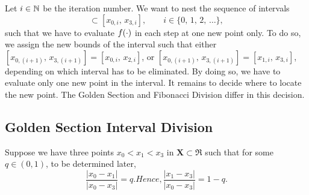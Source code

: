 Let $i \in {\mathbb N}$ be the iteration number.
We want to nest the sequence of intervals
\begin{equation}
[x_{0,(i+1)}, \, x_{3,(i+1)}] \subset [x_{0,i}, \, x_{3,i}], \qquad i \in \{0, \, 1, \, 2, \, \ldots \},
\end{equation}
such that we have to evaluate $f(\cdot)$ in each step at one new point only.
To do so, we assign the new bounds of the interval such that either 
$[x_{0,(i+1)}, \, x_{3,(i+1)}] = [x_{0,i}, \, x_{2,i}]$, or $[x_{0, (i+1)}, \, x_{3, (i+1)}] = [x_{1,i}, \, x_{3,i}]$, 
depending on which interval has to be eliminated. 
By doing so, we have to evaluate only one new point in the interval. 
It remains to decide where to locate the new point.
The Golden Section and Fibonacci Division differ in this decision.

\subsection{Golden Section Interval Division}
Suppose we have three points $x_0 < x_1 < x_3$ in $\mathbf X \subset \Re$
such that for some $q \in (0, 1)$, to be determined later,
\begin{subequations}
\begin{equation}
   \frac{ | x_0 - x_1 | }{ | x_0 - x_3 |  } = q.
   \label{eq:golSecQDef}
\end{equation}
Hence,
\begin{equation}
   \frac{ | x_1 - x_3 | }{ | x_0 - x_3 |  } = 1-q.
\end{equation}
\end{subequations}


